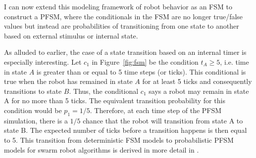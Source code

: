 \documentclass[defaultstyle,12pt]{proposal}
\begin{document}
I can now extend this modeling framework of robot behavior as an FSM to construct a PFSM, where the conditionals in the FSM are no longer true/false values but instead are probabilities of transitioning from one state to another based on external stimulus or internal state. 

As alluded to earlier, the case of a state transition based on an internal timer is especially interesting. Let $c_1$ in Figure~\ref{fig:fsm} be the condition $t_A \geq 5$, i.e. time in state $A$ is greater than or equal to 5 time steps (or ticks). This conditional is true when the robot has remained in state $A$ for at least 5 ticks and consequently transitions to state $B$. Thus, the conditional $c_1$ says a robot may remain in state A for no more than 5 ticks. The equivalent transition probability for this condition would be $p_1 = 1/5$. Therefore, at each time step of the PFSM simulation, there is a $1/5$ chance that the robot will transition from state A to state B. The expected number of ticks before a transition happens is then equal to 5. This transition from deterministic FSM models to probabilistic PFSM models for swarm robot algorithms is derived in more detail in \cite{Correll2007}.
 
\end{document}

